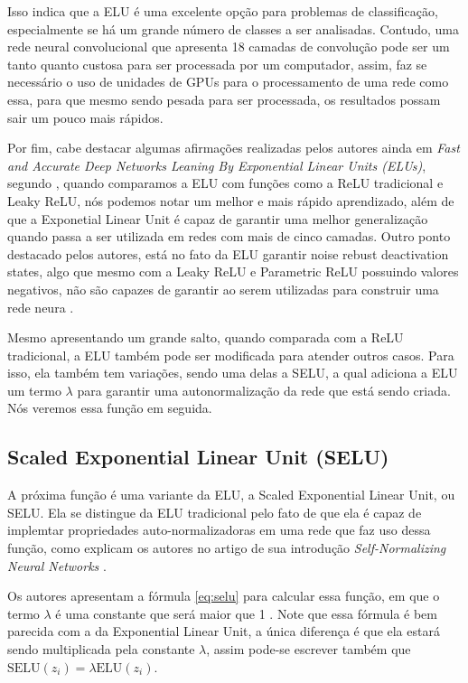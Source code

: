 Isso indica que a ELU é uma excelente opção para problemas de classificação, especialmente se há um grande número de classes a ser analisadas. Contudo, uma rede neural convolucional que apresenta 18 camadas de convolução pode ser um tanto quanto custosa para ser processada por um computador, assim, faz se necessário o uso de unidades de GPUs para o processamento de uma rede como essa, para que mesmo sendo pesada para ser processada, os resultados possam sair um pouco mais rápidos.

Por fim, cabe destacar algumas afirmações realizadas pelos autores ainda em \textit{Fast and Accurate Deep Networks Leaning By Exponential Linear Units (ELUs)}, segundo \textcite{ELUArticle}, quando comparamos a ELU com funções como a ReLU tradicional e Leaky ReLU, nós podemos notar um melhor e mais rápido aprendizado, além de que a Exponetial Linear Unit é capaz de garantir uma melhor generalização quando passa a ser utilizada em redes com mais de cinco camadas. Outro ponto destacado pelos autores, está no fato da ELU garantir noise rebust deactivation states, algo que mesmo com a Leaky ReLU e Parametric ReLU possuindo valores negativos, não são capazes de garantir ao serem utilizadas para construir uma rede neura \parencite{ELUArticle}.

Mesmo apresentando um grande salto, quando comparada com a ReLU tradicional, a ELU também pode ser modificada para atender outros casos. Para isso, ela também tem variações, sendo uma delas a SELU, a qual adiciona a ELU um termo $\lambda$ para garantir uma autonormalização da rede que está sendo criada. Nós veremos essa função em seguida.

\subsection{Scaled Exponential Linear Unit (SELU)}

A próxima função é uma variante da ELU, a Scaled Exponential Linear Unit, ou SELU. Ela se distingue da ELU tradicional pelo fato de que ela é capaz de implemtar propriedades auto-normalizadoras em uma rede que faz uso dessa função, como explicam os autores no artigo de sua introdução \textit{Self-Normalizing Neural Networks} \parencite{SELUArticle}.

Os autores apresentam a fórmula \ref{eq:selu} para calcular essa função, em que o termo $\lambda$ é uma constante que será maior que 1 \parencite{SELUArticle}. Note que essa fórmula é bem parecida com a da Exponential Linear Unit, a única diferença é que ela estará sendo multiplicada pela constante $\lambda$, assim pode-se escrever também que $\text{SELU}(z_i) = \lambda \text{ELU}(z_i)$.

